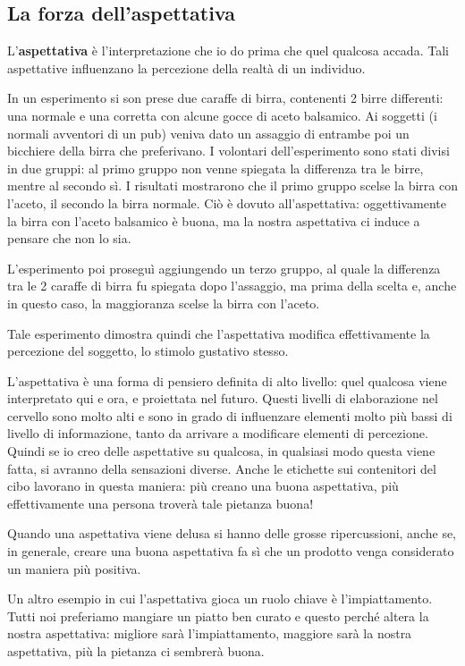 \subsection{La forza dell'aspettativa}

L'\textbf{aspettativa} è l'interpretazione che io do prima che quel qualcosa
accada.
Tali aspettative influenzano la percezione della realtà di un individuo.

In un esperimento si son prese due caraffe di birra, contenenti 2 birre
differenti: una normale e una corretta con alcune gocce di aceto balsamico.
Ai soggetti (i normali avventori di un pub) veniva dato un assaggio di entrambe
poi un bicchiere della birra che preferivano.
I volontari dell'esperimento sono stati divisi in due gruppi: al primo gruppo
non venne spiegata la differenza tra le birre, mentre al secondo sì. I
risultati mostrarono che il primo gruppo scelse la birra con l'aceto, il
secondo la birra normale. Ciò è dovuto all'aspettativa: oggettivamente la birra
con l'aceto balsamico è buona, ma la nostra aspettativa ci induce a pensare che
non lo sia.

L'esperimento poi proseguì aggiungendo un terzo gruppo, al quale la
differenza tra le 2 caraffe di birra fu spiegata dopo l'assaggio, ma
prima della scelta e, anche in questo caso, la maggioranza scelse la birra
con l'aceto.

Tale esperimento dimostra quindi che l'aspettativa modifica
effettivamente la percezione del soggetto, lo stimolo gustativo stesso.

L'aspettativa è una forma di pensiero definita di alto livello: quel qualcosa
viene interpretato qui e ora, e proiettata nel futuro. Questi livelli di
elaborazione nel cervello sono molto alti e sono in grado di influenzare
elementi molto più bassi di livello di informazione, tanto da arrivare a
modificare elementi di percezione. Quindi se io creo delle aspettative su
qualcosa, in qualsiasi modo questa viene fatta, si avranno della sensazioni
diverse. Anche le etichette sui contenitori del cibo lavorano in questa
maniera: più creano una buona aspettativa, più effettivamente una persona
troverà tale pietanza buona!

Quando una aspettativa viene delusa si hanno delle grosse ripercussioni, anche
se, in generale, creare una buona aspettativa fa sì che un prodotto venga
considerato un maniera più positiva.


Un altro esempio in cui l'aspettativa gioca un ruolo chiave è l'impiattamento.
Tutti noi preferiamo mangiare un piatto ben curato e questo perché altera la
nostra aspettativa: migliore sarà l'impiattamento, maggiore sarà la nostra
aspettativa, più la pietanza ci sembrerà buona.

